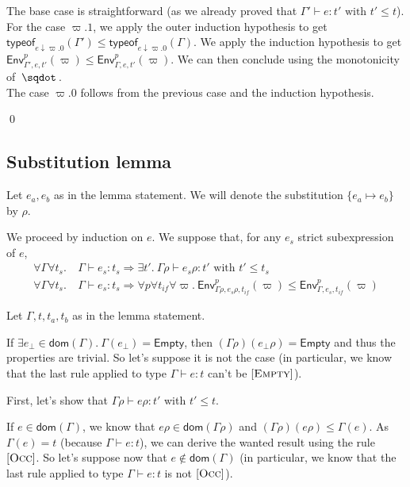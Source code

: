 \documentclass[a4paper]{article}%
\newcommand{\worra}[2]{#1\mathop{\,\sqdot\,} #2}
\newcommand{\dom}[1]{\textsf{dom}(#1)}
\newcommand{\Empty} {\textsf{Empty}}%
\newcommand{\subst}[2]{\{#1 \mapsto #2\}}
\newcommand{\tyof}[2]{\textsf{typeof}_{#2}(#1)}
\newcommand{\Gp}[2]{\textsf{Env}^{#1}_{#2}}
\newcommand{\occ}[2]{#1{\downarrow}#2}
\theoremstyle{definition}
\newcommand {\Rule}[1] {[\textsc{#1}]}
\begin{document}
        The base case is straightforward (as we already proved that $\Gamma' \vdash e:t' \text{ with } t' \leq t$).\\
        For the case $\varpi.1$, we apply the outer induction hypothesis to get $\tyof {\Gamma'} {\occ e {\varpi.0}} \leq \tyof {\Gamma} {\occ e {\varpi.0}}$.
        We apply the induction hypothesis to get $\Gp p {\Gamma',e,t'} (\varpi) \leq \Gp p {\Gamma,e,t'} (\varpi)$. We can then conclude using the monotonicity of $\worra {} {}$.\\
        The case $\varpi.0$ follows from the previous case and the induction hypothesis.
    
        \qed
    
        \subsection{Substitution lemma}
    
        Let $e_a,e_b$ as in the lemma statement. We will denote the substitution $\subst {e_a} {e_b}$ by $\rho$.
    
        We proceed by induction on $e$. We suppose that, for any $e_s$ strict subexpression of $e$,
        \begin{align*}
          \forall \Gamma \forall t_s.\ &\Gamma \vdash e_s:t_s \Rightarrow \exists t'.\ \Gamma \rho \vdash e_s \rho:t' \text{ with } t'\leq t_s\\
          \forall \Gamma \forall t_s.\ &\Gamma \vdash e_s:t_s \Rightarrow \forall p \forall t_{if} \forall \varpi.\ \Gp p {\Gamma\rho,e_s\rho,t_{if}} (\varpi) \leq \Gp p {\Gamma,e_s,t_{if}} (\varpi)
        \end{align*}
    
        Let $\Gamma,t,t_a,t_b$ as in the lemma statement.
    
        If $\exists e_\bot \in \dom {\Gamma}.\ \Gamma(e_\bot) = \Empty$, then $(\Gamma\rho)(e_\bot\rho) = \Empty$ and thus the properties are trivial.
        So let's suppose it is not the case (in particular, we know that the last rule applied to type $\Gamma \vdash e:t$ can't be $\Rule{Empty}$).
    
        First, let's show that $\Gamma \rho \vdash e \rho:t'$ with $t'\leq t$.
    
        If $e\in\dom\Gamma$, we know that $e\rho\in\dom{\Gamma\rho}$ and $(\Gamma\rho)(e\rho) \leq \Gamma(e)$.
        As $\Gamma(e) = t$ (because $\Gamma \vdash e:t$), we can derive the wanted result using the rule $\Rule {Occ}$.
        So let's suppose now that $e\not\in\dom\Gamma$ (in particular, we know that the last rule applied to type $\Gamma \vdash e:t$ is not $\Rule{Occ}$).
        
\end{document}
